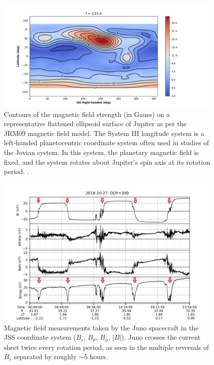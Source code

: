 \begin{figure}
    \centering
    \includegraphics[width=\textwidth]{images6/JRM09_Bmag.png}
    \caption{Contours of the magnetic field strength (in Gauss) on a representative flattened ellipsoid surface of Jupiter as per the JRM09 magnetic field model. The System III longitude system is a left-handed planetocentric coordinate system often used in studies of the Jovian system. In this system, the planetary magnetic field is fixed, and the system rotates about Jupiter's spin axis at its rotation period. 
    \protect\cite{Connerney2018}.}
    \label{fig:JRM09}
\end{figure}

\begin{figure}
    \centering
    \includegraphics[width=\textwidth]{images6/Juno-currentsheet-observations.png}
    \caption{Magnetic field measurements taken by the Juno spacecraft in the JSS coordinate system ($B_r$, $B_\theta$, $B_\phi$, $|B|$). Juno crosses the current sheet twice every rotation period, as seen in the multiple reversals of $B_r$ separated by roughly $\sim$5 hours.}
    \label{fig:juno-current-sheet}
\end{figure}



